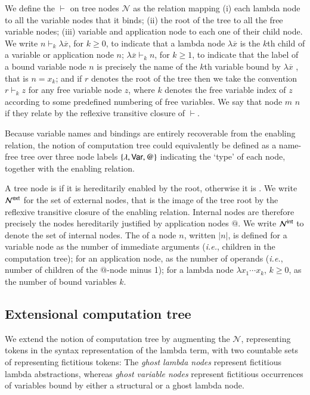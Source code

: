 \documentclass{elsarticle}
\makeatletter
\theoremstyle{plain}
\theoremstyle{definition}
\theoremstyle{remark}
\newcommand\Nodes{\mathcal{N}}%
\newcommand{\enables}{\vdash} %
\newcommand{\ExternalNodes}{\Nodes^{\sf ext}}
\newcommand{\InternalNodes}{\Nodes^{\sf int}}
\renewcommand\ie{{\it i.e.\@\xspace}}
\makeatother
\begin{document}
We define the  $\enables$ on tree nodes $\Nodes$ as the relation mapping (i) each lambda node to all the variable nodes that it binds; (ii) the root of the tree to all the free variable nodes; (iii) variable and application node to each one of their child node. We write $n \enables_k \lambda\overline{x}$, for $k\geq0$, to indicate that a lambda node $\lambda\overline{x}$ is the $k$th child of a variable or application node $n$; $\lambda\overline{x} \enables_k n$, for $k\geq1$, to indicate that the label of a bound variable node $n$ is precisely the name of the $k$th variable bound by  $\lambda\overline{x}$ , that is $n=x_k$; and if $r$ denotes the root of the tree then we take the convention $r \enables_k z$ for any free variable node $z$, where $k$ denotes the free variable index of $z$ according to some predefined numbering of free variables.
We say that node $m$  $n$ if they relate by the reflexive transitive closure of $\enables$.

Because variable names and bindings are entirely recoverable from the enabling relation, the notion of computation tree could equivalently be defined as a name-free tree over three node labels $\{ \lambda, {\sf Var}, @ \}$ indicating the `type' of each node, together with the enabling relation.

A tree node is  if it is hereditarily enabled by the root, otherwise it is . We write $\ExternalNodes$ for the set of external nodes, that is the image of the tree root by the reflexive transitive closure of the enabling relation. Internal nodes are therefore precisely the nodes hereditarily justified by application nodes $@$. We write $\InternalNodes$ to denote the set of internal nodes.
The  of a node $n$, written $|n|$,
is defined for a variable node as the number of immediate arguments (\ie, children in the computation tree); for an application node, as the number of operands (\ie, number of children of the $@$-node minus 1); for a lambda node $\lambda x_1 \cdots x_k$, $k\geq 0$, as the number of bound variables $k$.

\subsection{Extensional computation tree}
We extend the notion of computation tree by augmenting the
  $\Nodes$, representing tokens in the syntax representation of the lambda term,
with two countable sets of  representing fictitious tokens: The \emph{ghost lambda nodes}
represent fictitious lambda abstractions,
whereas \emph{ghost variable nodes} represent fictitious
occurrences of variables bound by either a structural or a ghost lambda node.
\end{document}
